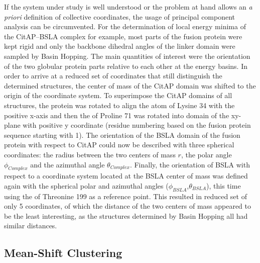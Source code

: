 \documentclass[english, a4paper, 12pt, titlepage, draft]{article}
\begin{document}
If the system under study is well understood or the problem at hand allows an \emph{a priori} definition of collective coordinates, the usage of principal component analysis can be circumvented.
For the determination of local energy minima of the CitAP--BSLA complex for example, most parts of the fusion protein were kept rigid and only the backbone dihedral angles of the linker domain were sampled by Basin Hopping.
The main quantities of interest were the orientation of the two globular protein parts relative to each other at the energy basins.
In order to arrive at a reduced set of coordinates that still distinguish the determined structures, the center of mass of the CitAP domain was shifted to the origin of the coordinate system.
To superimpose the CitAP domains of all structures, the protein was rotated to align the  atom of Lysine 34 with the positive x-axis and then the  of Proline 71 was rotated into domain of the xy-plane with positive y coordinate (residue numbering based on the fusion protein sequence starting with 1).
The orientation of the BSLA domain of the fusion protein with respect to CitAP could now be described with three spherical coordinates: the radius between the two centers of mass $r$, the polar angle $\phi_{Complex}$ and the azimuthal angle $\theta_{Complex}$.
Finally, the orientation of BSLA with respect to a coordinate system located at the BSLA center of mass was defined again with the spherical polar and azimuthal angles ($\phi_{BSLA}$,$\theta_{BSLA}$), this time using the  of Threonine 199 as a reference point.
This resulted in reduced set of only 5 coordinates, of which the distance of the two centers of mass appeared to be the least interesting, as the structures determined by Basin Hopping all had similar distances.




\subsection{Mean-Shift Clustering}
\end{document}

